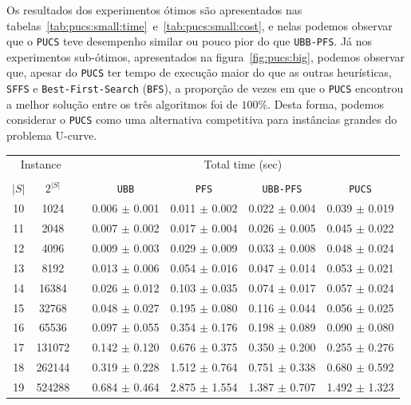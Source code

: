 \documentclass[12pt]{article}
\newcommand{\algname}[1]{\texttt{#1}}
\begin{document}
Os resultados dos experimentos ótimos são apresentados nas
tabelas~\ref{tab:pucs:small:time}~e~\ref{tab:pucs:small:cost}, e nelas
podemos observar que o \algname{PUCS} teve desempenho similar ou pouco
pior do que \algname{UBB-PFS}. Já nos experimentos sub-ótimos, 
apresentados na figura~\ref{fig:pucs:big}, podemos observar que, apesar 
do \algname{PUCS} ter tempo de execução maior do que as outras 
heurísticas, \algname{SFFS} e \algname{Best\--First\--Search} 
(\algname{BFS}), a proporção de vezes em que o \algname{PUCS} encontrou 
a melhor solução entre os três algoritmos foi de $100\%$. Desta forma, 
podemos considerar o \algname{PUCS} como uma alternativa competitiva 
para instâncias grandes do problema U-curve.

\begin{table}
\centering
\footnotesize
\begin{tabular}{cc c cccc}
\toprule
\multicolumn{2}{c}{Instance} & \phantom{} & \multicolumn{4}{c}{Total time (sec)} \\
\cline{1-2}\cline{4-7}\\
$|S|$ & $2^{|S|}$ && \algname{UBB} & \algname{PFS} & \algname{UBB-PFS} & \algname{PUCS} \\
10 &    1024 &&  0.006 $\pm$ 0.001 & 0.011 $\pm$ 0.002 & 0.022 $\pm$ 0.004 & 0.039 $\pm$ 0.019 \\
11 &    2048 &&  0.007 $\pm$ 0.002 & 0.017 $\pm$ 0.004 & 0.026 $\pm$ 0.005 & 0.045 $\pm$ 0.022 \\
12 &    4096 &&  0.009 $\pm$ 0.003 & 0.029 $\pm$ 0.009 & 0.033 $\pm$ 0.008 & 0.048 $\pm$ 0.024 \\
13 &    8192 &&  0.013 $\pm$ 0.006 & 0.054 $\pm$ 0.016 & 0.047 $\pm$ 0.014 & 0.053 $\pm$ 0.021 \\
14 &   16384 &&  0.026 $\pm$ 0.012 & 0.103 $\pm$ 0.035 & 0.074 $\pm$ 0.017 & 0.057 $\pm$ 0.024 \\
15 &   32768 &&  0.048 $\pm$ 0.027 & 0.195 $\pm$ 0.080 & 0.116 $\pm$ 0.044 & 0.056 $\pm$ 0.025 \\
16 &   65536 &&  0.097 $\pm$ 0.055 & 0.354 $\pm$ 0.176 & 0.198 $\pm$ 0.089 & 0.090 $\pm$ 0.080 \\
17 &  131072 &&  0.142 $\pm$ 0.120 & 0.676 $\pm$ 0.375 & 0.350 $\pm$ 0.200 & 0.255 $\pm$ 0.276 \\
18 &  262144 &&  0.319 $\pm$ 0.228 & 1.512 $\pm$ 0.764 & 0.751 $\pm$ 0.338 & 0.680 $\pm$ 0.592 \\
19 &  524288 &&  0.684 $\pm$ 0.464 & 2.875 $\pm$ 1.554 & 1.387 $\pm$ 0.707 & 1.492 $\pm$ 1.323 \\

\end{tabular}
\end{table}
\end{document}
